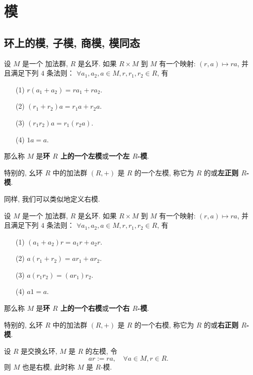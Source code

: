 \chapter{模}

\section{环上的模, 子模, 商模, 模同态}

\begin{definition}\label{左模}
	设 $M$ 是一个 \Abel 加法群, $R$ 是幺环. 如果 $R\times M$ 到 $M$ 有一个映射: $(r,a)\mapsto ra$, 并且满足下列 $4$ 条法则： $\forall a_1,a_2,a\in M,r,r_1,r_2\in R$, 有
	\begin{itemize}
		\item[(1)] $r(a_1+a_2)=ra_1+ra_2$.
		\item[(2)] $(r_1+r_2)a=r_1a+r_2a$.
		\item[(3)] $(r_1r_2)a=r_1(r_2a)$.
		\item[(4)] $1a=a$.
	\end{itemize}
	那么称 $M$ 是\textbf{环 $R$ 上的一个左模}或\textbf{一个左 $R$-模}.

	特别的, 幺环 $R$ 中的加法群 $(R,+)$ 是 $R$ 的一个左模, 称它为 $R$ 的或\textbf{左正则 $R$-模}.
\end{definition}

同样, 我们可以类似地定义右模.

\begin{definition}\label{右模}
	设 $M$ 是一个 \Abel 加法群, $R$ 是幺环. 如果 $R\times M$ 到 $M$ 有一个映射: $(r,a)\mapsto ra$, 并且满足下列 $4$ 条法则： $\forall a_1,a_2,a\in M,r,r_1,r_2\in R$, 有
	\begin{itemize}
		\item[(1)] $(a_1+a_2)r=a_1r+a_2r$.
		\item[(2)] $a(r_1+r_2)=ar_1+ar_2$.
		\item[(3)] $a(r_1r_2)=(ar_1)r_2$.
		\item[(4)] $a1=a$.
	\end{itemize}
	那么称 $M$ 是\textbf{环 $R$ 上的一个右模}或\textbf{一个右 $R$-模}.

	特别的, 幺环 $R$ 中的加法群 $(R,+)$ 是 $R$ 的一个右模, 称它为 $R$ 的或\textbf{右正则 $R$-模}.
\end{definition}

\begin{definition}
	设 $R$ 是交换幺环, $M$ 是 $R$ 的左模, 令 $$ar:=ra,\quad\forall a\in M,r\in R.$$
	则 $M$ 也是右模, 此时称 $M$ 是 $R$-模.
\end{definition}

